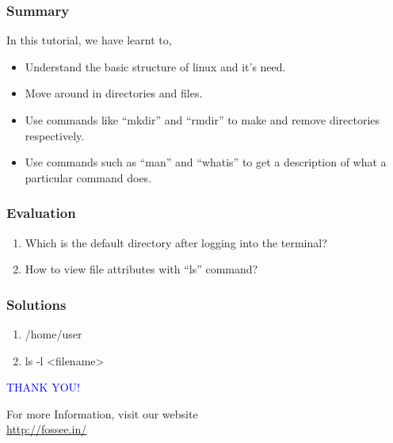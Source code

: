 \documentclass[12pt,compress]{beamer}
\begin{document}
\begin{frame}
\frametitle{Summary}
\label{sec-8}

  In this tutorial, we have learnt to,


\begin{itemize}
\item Understand the basic structure of linux and it's need.
\item Move around in directories and files.
\item Use commands like ``mkdir'' and ``rmdir'' to make and remove directories 
      respectively.
\item Use commands such as ``man'' and ``whatis'' to get a description of 
      what a particular command does.
\end{itemize}
\end{frame}
\begin{frame}[fragile]
\frametitle{Evaluation}
\label{sec-9}


\begin{enumerate}
\item Which is the default directory after logging into the terminal?
\vspace{8pt}
\item How to view file attributes with ``ls'' command? 
\end{enumerate}
\end{frame}
\begin{frame}
\frametitle{Solutions}
\label{sec-10}


\begin{enumerate}
\item /home/user
\vspace{15pt}
\item ls -l <filename>
\end{enumerate}
\end{frame}
\begin{frame}

  \begin{block}{}
  \begin{center}
  \textcolor{blue}{\Large THANK YOU!} 
  \end{center}
  \end{block}
\begin{block}{}
  \begin{center}
    For more Information, visit our website\\
    \url{http://fossee.in/}
  \end{center}  
  \end{block}
\end{frame}
\end{document}
